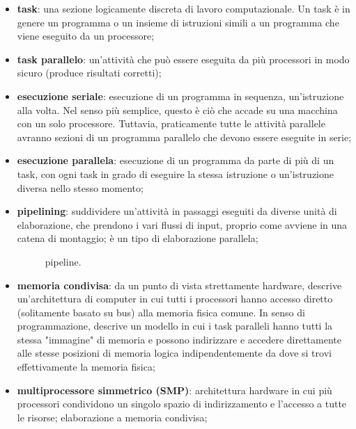 \begin{itemize}
	\item \textbf{task}: una sezione logicamente discreta di
	lavoro computazionale. Un task è in genere un
	programma o un insieme di istruzioni simili a un programma che
	viene eseguito da un processore;
	\item \textbf{task parallelo}: un'attività che può essere eseguita da più processori in modo sicuro (produce risultati corretti);
	\item \textbf{esecuzione seriale}: esecuzione di un programma
	in sequenza, un'istruzione alla volta. Nel senso più semplice, questo è ciò che accade su una
	macchina con un solo processore. Tuttavia, praticamente tutte
	le attività parallele avranno sezioni di un programma parallelo che devono essere eseguite in serie;
	\item \textbf{esecuzione parallela}: esecuzione di un programma da parte di
	più di un task, con ogni task in grado
	di eseguire la stessa istruzione o un'istruzione diversa nello
	stesso momento;
	\item \textbf{pipelining}: suddividere un'attività in passaggi eseguiti
	da diverse unità di elaborazione, che prendono i vari flussi di input, proprio come avviene in una catena di montaggio; è un tipo di elaborazione parallela;
	\begin{figure}[th]
		\centering
		\label{fig:pipeline}
		\caption{pipeline.}
	\end{figure}
	\item \textbf{memoria condivisa}: da un punto di vista strettamente hardware, descrive un'architettura di computer
	in cui tutti i processori hanno accesso diretto (solitamente basato su bus) alla memoria fisica comune. In senso di programmazione, descrive un modello in cui
	i task paralleli hanno tutti la stessa "immagine" di
	memoria e possono indirizzare e accedere direttamente alle
	stesse posizioni di memoria logica indipendentemente da
	dove si trovi effettivamente la memoria fisica;
	\item \textbf{multiprocessore simmetrico (SMP)}: architettura hardware in cui più processori condividono un singolo spazio di indirizzamento e l'accesso a tutte le risorse; elaborazione a memoria condivisa;

\end{itemize}
